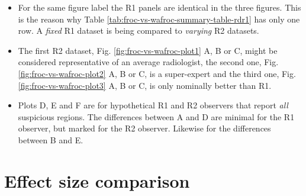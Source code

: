 \documentclass[
]{book}
\providecommand{\tightlist}{%
  \setlength{\itemsep}{0pt}\setlength{\parskip}{0pt}}
\begin{document}
\begin{itemize}
\tightlist
\item
  For the same figure label the R1 panels are identical in the three figures. This is the reason why Table \ref{tab:froc-vs-wafroc-summary-table-rdr1} has only one row. A \emph{fixed} R1 dataset is being compared to \emph{varying} R2 datasets.
\item
  The first R2 dataset, Fig. \ref{fig:froc-vs-wafroc-plot1} A, B or C, might be considered representative of an average radiologist, the second one, Fig. \ref{fig:froc-vs-wafroc-plot2} A, B or C, is a super-expert and the third one, Fig. \ref{fig:froc-vs-wafroc-plot3} A, B or C, is only nominally better than R1.
\item
  Plots D, E and F are for hypothetical R1 and R2 observers that report \emph{all} suspicious regions. The differences between A and D are minimal for the R1 observer, but marked for the R2 observer. Likewise for the differences between B and E.
\end{itemize}

\hypertarget{froc-vs-wafroc-effect-sizes}{%
\section{Effect size comparison}\label{froc-vs-wafroc-effect-sizes}}
\end{document}

